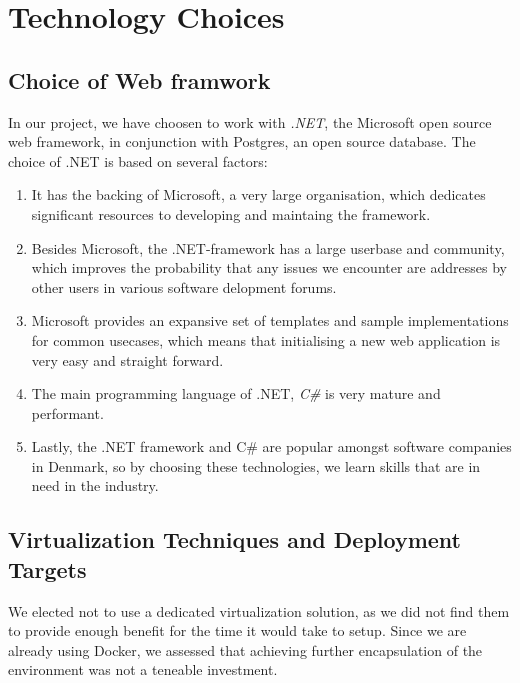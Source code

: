 
\section{Technology Choices}

\subsection{Choice of Web framwork}
In our project, we have choosen to work with \textit{.NET}, the Microsoft open source web framework, in conjunction with Postgres, an open source database.
The choice of .NET is based on several factors:

\begin{enumerate}
	\item It has the backing of Microsoft, a very large organisation, which dedicates significant resources to developing and maintaing the framework.
	\item Besides Microsoft, the .NET-framework has a large userbase and community, which improves the probability that any issues we encounter are addresses by other users in various software delopment forums.
	\item Microsoft provides an expansive set of templates and sample implementations for common usecases, which means that initialising a new web application is very easy and straight forward.
	\item The main programming language of .NET, \textit{C\#} is very mature and performant. %
	\item Lastly, the .NET framework and C\# are popular amongst software companies in Denmark, so by choosing these technologies, we learn skills that are in need in the industry.
\end{enumerate}


\subsection{Virtualization Techniques and Deployment Targets}

We elected not to use a dedicated virtualization solution, as we did not find them to provide enough benefit for the time it would take to setup. Since we are already using Docker, we assessed that achieving further encapsulation of the environment was not a teneable investment.

